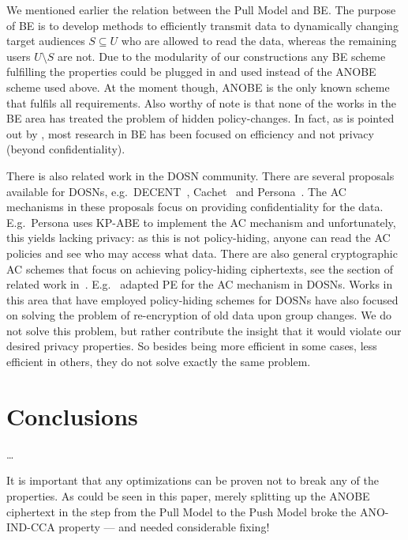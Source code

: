 We mentioned earlier the relation between the Pull Model and \ac{BE}.
The purpose of \ac{BE} is to develop methods to efficiently transmit data to 
dynamically changing target audiences \(S\subseteq U\) who are allowed to read 
the data, whereas the remaining users \(U\setminus S\) are not.
Due to the modularity of our constructions any \ac{BE} scheme fulfilling the 
properties could be plugged in and used instead of the \ac{ANOBE} scheme used 
above.
At the moment though, \ac{ANOBE} is the only known scheme that fulfils all 
requirements.
Also worthy of note is that none of the works in the \ac{BE} area has treated 
the problem of hidden policy-changes.
In fact, as is pointed out by \citet{ANOBE}, most research in \ac{BE} has been 
focused on efficiency and not privacy (beyond confidentiality).

There is also related work in the \ac{DOSN} community.
There are several proposals available for \acp{DOSN}, e.g.\ 
DECENT~\cite{DECENT}, Cachet~\cite{Cachet} and Persona~\cite{Persona}.
The \ac{AC} mechanisms in these proposals focus on providing confidentiality 
for the data.
E.g.\ Persona uses \ac{KP-ABE} to implement the \ac{AC} mechanism and
unfortunately, this yields lacking privacy: as this is not policy-hiding, 
anyone can read the \ac{AC} policies and see who may access what data.
There are also general cryptographic \ac{AC} schemes that focus on achieving 
policy-hiding ciphertexts, see the section of related work 
in~\cite{TowardsPPACwHPHCHD}.
E.g.\ \citet{PEAC} adapted \ac{PE} for the \ac{AC} mechanism in \acp{DOSN}.
Works in this area that have employed policy-hiding schemes for \acp{DOSN} have
also focused on solving the problem of re-encryption of old data upon group 
changes.
We do not solve this problem, but rather contribute the insight that it would 
violate our desired privacy properties.
So besides being more efficient in some cases, less efficient in others, they 
do not solve exactly the same problem.



\section{Conclusions}\label{Conclusions}

\dots

It is important that any optimizations can be proven not to break any of the 
properties.
As could be seen in this paper, merely splitting up the \ac{ANOBE} ciphertext 
in the step from the Pull Model to the Push Model broke the ANO-IND-CCA 
property --- and needed considerable fixing!

